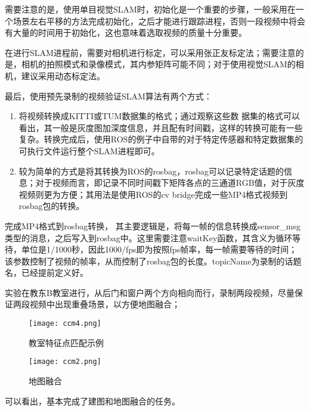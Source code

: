需要注意的是，使用单目视觉SLAM时，初始化是一个重要的步骤，一般采用在一个场景左右平移的方法完成初始化，之后才能进行跟踪进程，否则一段视频中将会有大量的时间用于初始化，这也意味着选取视频的质量十分重要。

在进行SLAM进程前，需要对相机进行标定，可以采用张正友标定法；需要注意的是，相机的拍照模式和录像模式，其内参矩阵可能不同；对于使用视觉SLAM的相机，建议采用动态标定法。

最后，使用预先录制的视频验证SLAM算法有两个方式：

\begin{enumerate}
	\item 将视频转换成KITTI或TUM数据集的格式；通过观察这些数
	据集的格式可以看出，其一般是灰度图加深度信息，并且配有时间戳，这样的转换可能有一些复杂。转换完成后，使用ROS的例子中自带的对于特定传感器和特定数据集的可执行文件运行整个SLAM进程即可。
	\item 较为简单的方式是将其转换为ROS的rosbag，rosbag可以记录特定话题的信息；对于视频而言，即记录不同时间戳下矩阵各点的三通道RGB值，对于灰度视频则更为方便；其用法是使用ROS的cv bridge完成一些MP4格式视频到rosbag包的转换。
\end{enumerate}

完成MP4格式到rosbag转换，
其主要逻辑是，将每一帧的信息转换成sensor\_msg类型的消息，之后写入到rosbag中。这里需要注意waitKey函数，其含义为循环等待，单位是1/1000秒，因此1000/fps即为按照fps帧率，每一帧需要等待的时间；该参数控制了视频的帧率，从而控制了rosbag包的长度。topicName为录制的话题名，已经提前定义好。

实验在教东B教室进行，从后门和窗户两个方向相向而行，录制两段视频，尽量保证两段视频中出现重叠场景，以方便地图融合；

\begin{figure}[htbp]
	\centering
	\begin{minipage}[t]{0.45\columnwidth} %
		\centering
		\texttt{[image: ccm4.png]}
		\caption{教室特征点匹配示例}
		\label{fig5-1}
	\end{minipage}
	\begin{minipage}[t]{0.45\columnwidth}
		\centering
		\texttt{[image: ccm2.png]}
		\caption{地图融合}
		\label{fig5-2}
	\end{minipage}
\end{figure}

可以看出，基本完成了建图和地图融合的任务。